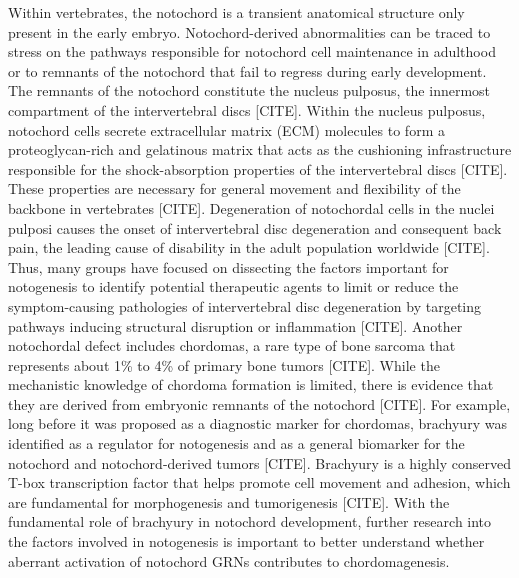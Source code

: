 Within vertebrates, the notochord is a transient anatomical structure only present in the early embryo. Notochord-derived abnormalities can be traced to stress on the pathways responsible for notochord cell maintenance in adulthood or to remnants of the notochord that fail to regress during early development. The remnants of the notochord constitute the nucleus pulposus, the innermost compartment of the intervertebral discs [CITE]. Within the nucleus pulposus, notochord cells secrete extracellular matrix (ECM) molecules to form a proteoglycan-rich and gelatinous matrix that acts as the cushioning infrastructure responsible for the shock-absorption properties of the intervertebral discs [CITE]. These properties are necessary for general movement and flexibility of the backbone in vertebrates [CITE]. Degeneration of notochordal cells in the nuclei pulposi causes the onset of intervertebral disc degeneration and consequent back pain, the leading cause of disability in the adult population worldwide [CITE]. Thus, many groups have focused on dissecting the factors important for notogenesis to identify potential therapeutic agents to limit or reduce the symptom-causing pathologies of intervertebral disc degeneration by targeting pathways inducing structural disruption or inflammation [CITE]. Another notochordal defect includes chordomas, a rare type of bone sarcoma that represents about 1\% to 4\% of primary bone tumors [CITE]. While the mechanistic knowledge of chordoma formation is limited, there is evidence that they are derived from embryonic remnants of the notochord [CITE]. For example, long before it was proposed as a diagnostic marker for chordomas, brachyury was identified as a regulator for notogenesis and as a general biomarker for the notochord and notochord-derived tumors [CITE]. Brachyury is a highly conserved T-box transcription factor that helps promote cell movement and adhesion, which are fundamental for morphogenesis and tumorigenesis [CITE]. With the fundamental role of brachyury in notochord development, further research into the factors involved in notogenesis is important to better understand whether aberrant activation of notochord GRNs contributes to chordomagenesis.

